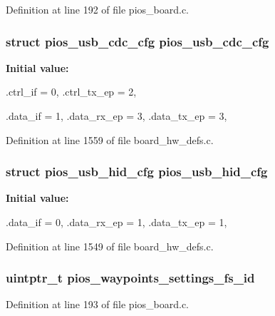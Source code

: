 \-Definition at line 192 of file pios\-\_\-board.\-c.

\hypertarget{group___flying_f4_ga05cc3e449d417c7f9097d2659e6f5ca3}{
\subsubsection[{pios\-\_\-usb\-\_\-cdc\-\_\-cfg}]{\setlength{\rightskip}{0pt plus 5cm}struct {\bf pios\-\_\-usb\-\_\-cdc\-\_\-cfg} {\bf pios\-\_\-usb\-\_\-cdc\-\_\-cfg}}}\label{group___flying_f4_ga05cc3e449d417c7f9097d2659e6f5ca3}
{\bfseries \-Initial value\-:}
\begin{DoxyCode}
 {
        .ctrl_if = 0,
        .ctrl_tx_ep = 2,

        .data_if = 1,
        .data_rx_ep = 3,
        .data_tx_ep = 3,
}
\end{DoxyCode}


\-Definition at line 1559 of file board\-\_\-hw\-\_\-defs.\-c.

\hypertarget{group___flying_f4_ga3665f6d3a2cccc431b55b9432291e94c}{
\subsubsection[{pios\-\_\-usb\-\_\-hid\-\_\-cfg}]{\setlength{\rightskip}{0pt plus 5cm}struct {\bf pios\-\_\-usb\-\_\-hid\-\_\-cfg} {\bf pios\-\_\-usb\-\_\-hid\-\_\-cfg}}}\label{group___flying_f4_ga3665f6d3a2cccc431b55b9432291e94c}
{\bfseries \-Initial value\-:}
\begin{DoxyCode}
 {
        .data_if = 0,
        .data_rx_ep = 1,
        .data_tx_ep = 1,
}
\end{DoxyCode}


\-Definition at line 1549 of file board\-\_\-hw\-\_\-defs.\-c.

\hypertarget{group___flying_f4_ga4b04979e5fb31eaa66088178605835cd}{
\subsubsection[{pios\-\_\-waypoints\-\_\-settings\-\_\-fs\-\_\-id}]{\setlength{\rightskip}{0pt plus 5cm}uintptr\-\_\-t {\bf pios\-\_\-waypoints\-\_\-settings\-\_\-fs\-\_\-id}}}\label{group___flying_f4_ga4b04979e5fb31eaa66088178605835cd}


\-Definition at line 193 of file pios\-\_\-board.\-c.

